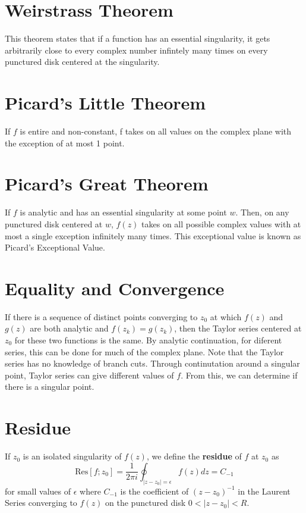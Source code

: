 \documentclass[../main.tex]{subfiles}
\begin{document}
\section{Weirstrass Theorem}
This theorem states that if a function has an essential singularity, it gets arbitrarily close to
every complex number infintely many times on every punctured disk centered at the singularity.

\section{Picard's Little Theorem}
If $f$ is entire and non-constant, f takes on all values on the complex plane with the exception of 
at most 1 point.

\section{Picard's Great Theorem}
If $f$ is analytic and has an essential singularity at some point $w$. Then, on any punctured disk
centered at $w$, $f(z)$ takes on all possible complex values with at most a single exception infinitely
many times. This exceptional value is known as Picard's Exceptional Value.

\section{Equality and Convergence}
If there is a sequence of distinct points converging to $z_{0}$ at which $f(z)$ and $g(z)$ are both
analytic and $f(z_{k})=g(z_{k})$, then the Taylor series centered at $z_{0}$ for these two functions
is the same. By analytic continuation, for diferent series, this can be done for much of the complex plane.
Note that the Taylor series has no knowledge of branch cuts. Through continutation around a singular point,
Taylor series can give different values of $f$. From this, we can determine if there is a singular point.

\section{Residue}
If $z_{0}$ is an isolated singularity of $f(z)$, we define the \textbf{residue} of $f$ at $z_{0}$
as $$\text{Res}[f;z_{0}]=\frac{1}{2\pi i}\oint_{|z-z_0|=\epsilon}f(z)dz=C_{-1}$$
for small values of $\epsilon$ where $C_{-1}$ is the coefficient of $(z-z_{0})^{-1}$
in the Laurent Series converging to $f(z)$ on the punctured disk $0<|z-z_{0}|<R$.
\end{document}
